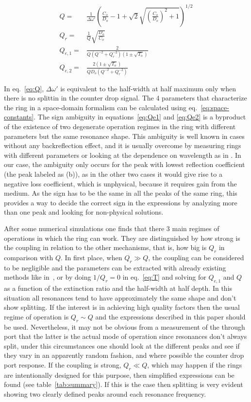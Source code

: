 \documentclass[10pt,letterpaper]{article}
\begin{document}
\begin{align}
    Q=&\frac{1}{\Delta\omega'}\left(\frac{C_o}{D_o}-1 + \sqrt{2}\sqrt{\left(\frac{C_o}{D_o}\right)^2+1}\right)^{1/2} \label{eq:Q} \\
    Q_r=&\frac{1}{Q}\sqrt{\frac{D_o}{C_o}} \label{eq:Qu}\\
    Q_{e,1}=&\frac{2}{Q(Q^{-2}+Q_r^{-2})(1\pm\sqrt{T_o})}  \label{eq:Qe1}\\
    Q_{e,2}=&\frac{2(1\pm\sqrt{T_o})}{QD_o(Q^{-2}+Q_r^{-2})}  \label{eq:Qe2}
\end{align}

In eq.~\ref{eq:Q}, $\Delta\omega'$ is equivalent to the half-width at half maximum only when there is no splittin in the counter drop signal. The 4 parameters that characterize the ring in a space-domain formalism can be calculated using eq.~\ref{eq:space-constants}. The sign ambiguity in equations~\ref{eq:Qe1} and \ref{eq:Qe2} is a byproduct of the existence of two degenerate operation regimes in the ring with different parameters but the same resonance shape. This ambiguity is well known in cases without any backreflection effect, and it is usually  overcome by measuring rings with different parameters or looking at the dependence on wavelength as in \cite{McKinnon2009}. In our case, the ambiguity only occurs for the peak with lowest reflection coefficient (the peak labeled as (b)), as in the other two cases it would give rise to a negative loss coefficient, which is unphysical, because it requires gain from the medium. As the sign has to be the same in all the peaks of the same ring, this provides a way to decide the correct sign in the expressions by analyzing more than one peak and looking for non-physical solutions.

After some numerical simulations one finds that there 3 main regimes of operations in which the ring can work. They are distinguished by how strong is the coupling in relation to the other mechanisms, that is, how big is $Q_r$ in comparison with $Q$. In first place, when $Q_r \gg Q$, the coupling can be considered to be negligible and the parameters can be extracted with already existing methods like in~\cite{McKinnon2009}, or by doing $1/Q_r=0$ in eq.~\ref{eq:T} and solving for $Q_{e,1}$ and $Q$ as a function of the extinction ratio and the half-width at half depth. In this situation all resonances tend to have approximately the same shape and don't show splitting. If the interest is in achieving high quality factors then the usual regime of operation is $Q_r \sim Q$ and the expressions described in this paper should be used. Nevertheless, it may not be obvious from a measurement of the through port that the latter is the actual mode of operation since resonances don't always split, under this circumstances one should look at the different peaks and see if they vary in an apparently random fashion, and where possible the counter drop port response. If the coupling is strong, $Q_r \ll Q$, which may happen if the rings are intentionally designed for this purpose, then simplified expressions can be found (see table~\ref{tab:summary}). If this is the case then splitting is very evident showing two clearly defined peaks around each resonance frequency.
\end{document}
